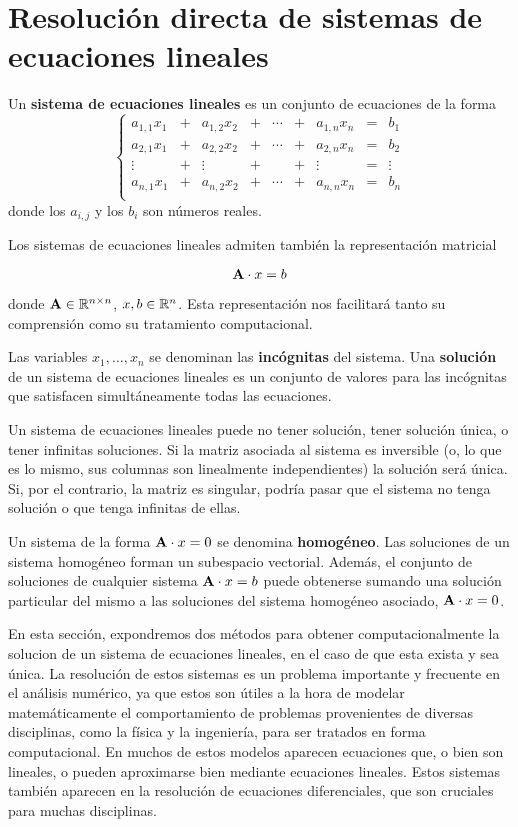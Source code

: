 \section{Resolución directa de sistemas de ecuaciones lineales}

Un \textbf{sistema de ecuaciones lineales} es un conjunto de ecuaciones de la
forma
\[ \left\lbrace \begin{matrix}
    a_{1,1} x_1 &+& a_{1,2} x_2 &+& \cdots &+& a_{1,n} x_n & = & b_1    \\
    a_{2,1} x_1 &+& a_{2,2} x_2 &+& \cdots &+& a_{2,n} x_n & = & b_2    \\
    \vdots     &+& \vdots     &+&     &+& \vdots     & = & \vdots \\
    a_{n,1} x_1 &+& a_{n,2} x_2 &+& \cdots &+& a_{n,n} x_n & = & b_n    \\
\end{matrix} \right. \]
donde los $a_{i,j}$ y los $b_i$ son números reales.

Los sistemas de ecuaciones lineales admiten también la representación matricial

\[ \mathbf{A} \cdot x = b \]

donde $\mathbf{A} \in \mathbb{R} ^{n \times n}$, $x, b \in \mathbb{R}^{n}$. Esta
representación nos facilitará tanto su comprensión como su tratamiento
computacional.

Las variables $x_1, \dots, x_n$ se denominan las \textbf{incógnitas} del sistema.
Una \textbf{solución} de un sistema de ecuaciones lineales es un conjunto de
valores para las incógnitas que satisfacen simultáneamente todas las ecuaciones.

Un sistema de ecuaciones lineales puede no tener solución, tener solución
única, o tener infinitas soluciones. Si la matriz asociada al sistema es
inversible (o, lo que es lo mismo, sus columnas son linealmente independientes)
la solución será única. Si, por el contrario, la matriz es singular,
podría pasar que el sistema no tenga solución o que tenga infinitas de ellas.

Un sistema de la forma $\mathbf{A} \cdot x = 0$ se denomina \textbf{homogéneo}.
Las soluciones de un sistema homogéneo forman un subespacio vectorial. Además,
el conjunto de soluciones de cualquier sistema $\mathbf{A} \cdot x = b$ puede
obtenerse sumando una solución particular del mismo a las soluciones del
sistema homogéneo asociado, $\mathbf{A} \cdot x = 0$.

En esta sección, expondremos dos métodos para obtener computacionalmente la
solucion de un sistema de ecuaciones lineales, en el caso de que esta exista y
sea única. La resolución de estos sistemas es un problema importante y
frecuente en el análisis numérico, ya que estos son útiles a la hora de
modelar matemáticamente el comportamiento de problemas provenientes de
diversas disciplinas, como la física y la ingeniería, para ser tratados en
forma computacional. En muchos de estos modelos aparecen ecuaciones
que, o bien son lineales, o pueden aproximarse bien mediante ecuaciones
lineales. Estos sistemas también aparecen en la resolución de ecuaciones
diferenciales, que son cruciales para muchas disciplinas.

